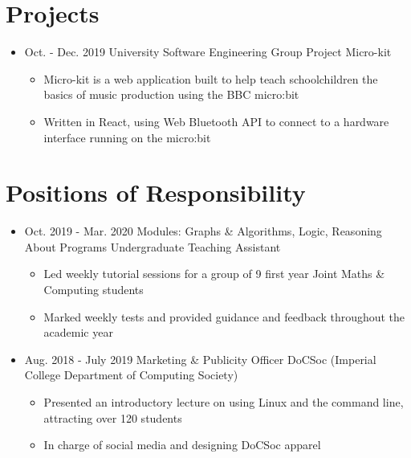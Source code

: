 \documentclass[11pt,a4paper,sans]{moderncv}        %
\begin{document}
\section{Projects}

\begin{itemize}

\item{
\cventry
{Oct. - Dec. 2019}
{University Software Engineering Group Project}
{Micro-kit}
{}{}{
\begin{itemize}
\item Micro-kit is a web application built to help teach schoolchildren the basics of music production using the BBC micro:bit
\item Written in React, using Web Bluetooth API to connect to a hardware interface running on the micro:bit
\end{itemize}
}}

\end{itemize}

\section{Positions of Responsibility}

\begin{itemize}

\item{
\cventry
{Oct. 2019 - Mar. 2020}
{Modules: Graphs \& Algorithms, Logic, Reasoning About Programs}
{Undergraduate Teaching Assistant}
{}{}{
\begin{itemize}
\item Led weekly tutorial sessions for a group of 9 first year Joint Maths \& Computing students
\item Marked weekly tests and provided guidance and feedback throughout the academic year
\end{itemize}
}}

\item{
\cventry
{Aug. 2018 - July 2019}
{Marketing \& Publicity Officer}
{DoCSoc (Imperial College Department of Computing Society)}
{}{}{
\begin{itemize}
\item Presented an introductory lecture on using Linux and the command line, attracting over 120 students
\item In charge of social media and designing DoCSoc apparel
\end{itemize}
}}

\end{itemize}
\end{document}
